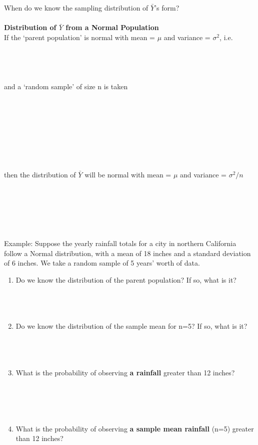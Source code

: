 \newpage

When do we know the sampling distribution of $\bar{Y}$'s form?\\~\\
\large \textbf{Distribution of $\bar{Y}$ from a Normal Population} \normalsize\\
If the `parent population' is normal with mean = $\mu$ and variance = $\sigma^2$, i.e.\\~\\~\\~\\~\\
and a `random sample' of size n is taken\\~\\~\\~\\~\\~\\~\\~\\~\\
then the distribution of $\bar{Y}$ will be normal with mean = $\mu$ and variance = $\sigma^2/n$\\~\\~\\~\\~\\~\\~\\
 
Example: Suppose the yearly rainfall totals for a city in northern California follow a Normal distribution, with a mean of 18 inches and a standard deviation of 6 inches.  We take a random sample of 5 years’ worth of data.
\begin{enumerate}
\item Do we know the distribution of the parent population?  If so, what is it?\\~\\~\\~\\
\item Do we know the distribution of the sample mean for n=5?  If so, what is it? \\~\\~\\~\\
\item What is the probability of observing \textbf{a rainfall} greater than 12 inches?\\~\\~\\~\\~\\
\item What is the probability of observing \textbf{a sample mean rainfall} (n=5) greater than 12 inches?
\end{enumerate}

